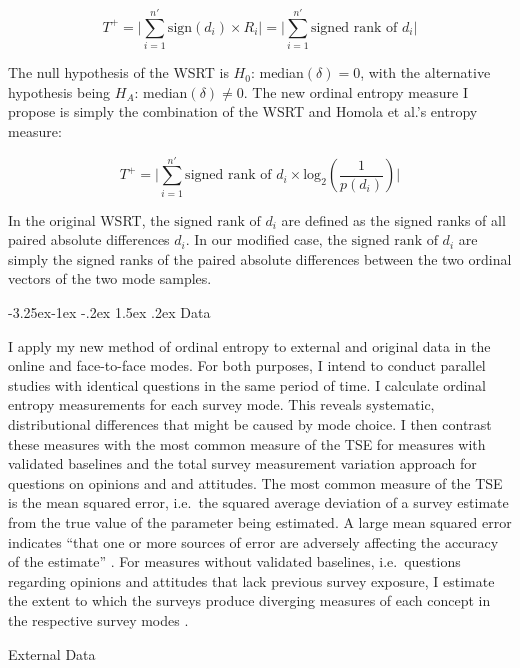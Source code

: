\documentclass[12pt,]{article}
\makeatletter
\renewcommand\subsection{\@startsection{subsection}{2}{\z@}%
                                     {-3.25ex\@plus -1ex \@minus -.2ex}
                                     {1.5ex \@plus .2ex}
                                     {\normalsize\bfseries}} %
\renewcommand\subsubsection{\@startsection{subsubsection}{3}{\z@}
                                     {-3.25ex\@plus -1ex \@minus -.2ex}
                                     {1.5ex \@plus .2ex}
                                     {\normalsize\itshape}} %
\makeatother
\begin{document}
\[T^+ = \Bigg\vert \sum\limits_{i=1}^{n'} \text{sign}(d_i) \times R_i \Bigg\vert = \Bigg\vert \sum\limits_{i=1}^{n'} \text{signed rank of } d_i \Bigg\vert\]

The null hypothesis of the WSRT is \(H_0\): median\((\delta) = 0\), with
the alternative hypothesis being \(H_A\): median\((\delta) \neq 0\). The
new ordinal entropy measure I propose is simply the combination of the
WSRT and Homola et al.'s entropy measure:

\[T^+ = \Bigg\vert \sum\limits_{i=1}^{n'} \text{signed rank of } d_i \times \text{log}_2 (\frac{1}{p(d_i)}) \Bigg\vert\]

In the original WSRT, the \(\text{signed rank of } d_i\) are defined as
the signed ranks of all paired absolute differences \(d_i\). In our
modified case, the \(\text{signed rank of } d_i\) are simply the signed
ranks of the paired absolute differences between the two ordinal vectors
of the two mode samples.

\subsection{Data}\label{mode-data}

I apply my new method of ordinal entropy to external and original data
in the online and face-to-face modes. For both purposes, I intend to
conduct parallel studies with identical questions in the same period of
time. I calculate ordinal entropy measurements for each survey mode.
This reveals systematic, distributional differences that might be caused
by mode choice. I then contrast these measures with the most common
measure of the TSE for measures with validated baselines and the total
survey measurement variation approach for questions on opinions and and
attitudes. The most common measure of the TSE is the mean squared error,
i.e.~the squared average deviation of a survey estimate from the true
value of the parameter being estimated. A large mean squared error
indicates ``that one or more sources of error are adversely affecting
the accuracy of the estimate'' \citep[p.~826]{biemer_2010_total}. For
measures without validated baselines, i.e.~questions regarding opinions
and attitudes that lack previous survey exposure, I estimate the extent
to which the surveys produce diverging measures of each concept in the
respective survey modes \citep{smith_2011_refining}.

\subsubsection{External Data}\label{mode-data-external}
\end{document}
